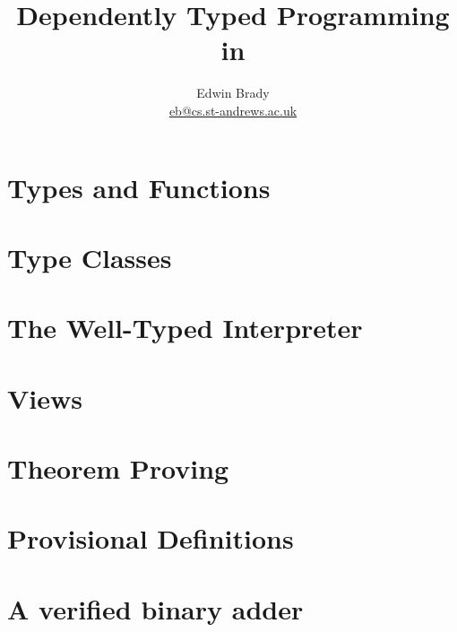 \documentclass{article}
\title{Dependently Typed Programming in \Idris{}}
\author{Edwin Brady \\ \url{eb@cs.st-andrews.ac.uk}}
\begin{document}
\maketitle






\section{Types and Functions}
\section{Type Classes}
\section{The Well-Typed Interpreter}
\section{Views}
\section{Theorem Proving}
\section{Provisional Definitions}
\section{A verified binary adder}





\end{document}
